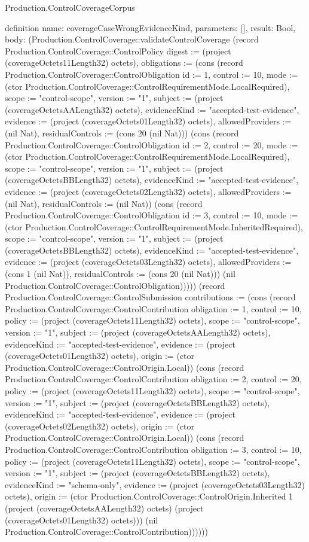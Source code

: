 \begin{lexlean}{Production.ControlCoverageCorpus}
\begin{semanticmodule}
definition{
  name: coverageCaseWrongEvidenceKind,
  parameters: [],
  result: Bool,
  body: (Production.ControlCoverage::validateControlCoverage (record Production.ControlCoverage::ControlPolicy {digest := (project (coverageOctets11Length32) octets), obligations := (cons (record Production.ControlCoverage::ControlObligation {id := 1, control := 10, mode := (ctor Production.ControlCoverage::ControlRequirementMode.LocalRequired), scope := "control-scope", version := "1", subject := (project (coverageOctetsAALength32) octets), evidenceKind := "accepted-test-evidence", evidence := (project (coverageOctets01Length32) octets), allowedProviders := (nil Nat), residualControls := (cons 20 (nil Nat))}) (cons (record Production.ControlCoverage::ControlObligation {id := 2, control := 20, mode := (ctor Production.ControlCoverage::ControlRequirementMode.LocalRequired), scope := "control-scope", version := "1", subject := (project (coverageOctetsBBLength32) octets), evidenceKind := "accepted-test-evidence", evidence := (project (coverageOctets02Length32) octets), allowedProviders := (nil Nat), residualControls := (nil Nat)}) (cons (record Production.ControlCoverage::ControlObligation {id := 3, control := 10, mode := (ctor Production.ControlCoverage::ControlRequirementMode.InheritedRequired), scope := "control-scope", version := "1", subject := (project (coverageOctetsBBLength32) octets), evidenceKind := "accepted-test-evidence", evidence := (project (coverageOctets03Length32) octets), allowedProviders := (cons 1 (nil Nat)), residualControls := (cons 20 (nil Nat))}) (nil Production.ControlCoverage::ControlObligation))))}) (record Production.ControlCoverage::ControlSubmission {contributions := (cons (record Production.ControlCoverage::ControlContribution {obligation := 1, control := 10, policy := (project (coverageOctets11Length32) octets), scope := "control-scope", version := "1", subject := (project (coverageOctetsAALength32) octets), evidenceKind := "accepted-test-evidence", evidence := (project (coverageOctets01Length32) octets), origin := (ctor Production.ControlCoverage::ControlOrigin.Local)}) (cons (record Production.ControlCoverage::ControlContribution {obligation := 2, control := 20, policy := (project (coverageOctets11Length32) octets), scope := "control-scope", version := "1", subject := (project (coverageOctetsBBLength32) octets), evidenceKind := "accepted-test-evidence", evidence := (project (coverageOctets02Length32) octets), origin := (ctor Production.ControlCoverage::ControlOrigin.Local)}) (cons (record Production.ControlCoverage::ControlContribution {obligation := 3, control := 10, policy := (project (coverageOctets11Length32) octets), scope := "control-scope", version := "1", subject := (project (coverageOctetsBBLength32) octets), evidenceKind := "schema-only", evidence := (project (coverageOctets03Length32) octets), origin := (ctor Production.ControlCoverage::ControlOrigin.Inherited 1 (project (coverageOctetsAALength32) octets) (project (coverageOctets01Length32) octets))}) (nil Production.ControlCoverage::ControlContribution))))}))
}


\end{semanticmodule}
\end{lexlean}
